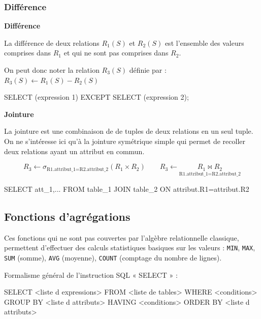 \documentclass[10pt,fleqn]{article} %
\begin{document}
\subsubsection{Différence}
\begin{defi}

\textbf{Différence}

La différence de deux relations $R_1(S)$ et $R_2(S)$ est l'ensemble des valeurs comprises dans $R_1$ et qui ne sont pas comprises dans $R_2$. 

On peut donc noter la relation $R_3(S)$ définie par : $R_3(S)\leftarrow R_1(S)-R_2(S)$


\end{defi}

\begin{envsql}
\begin{sql}
SELECT  (expression 1) EXCEPT SELECT (expression 2);
\end{sql}
\end{envsql}



\begin{defi}

\textbf{Jointure}

La jointure est une combinaison de de tuples de deux relations en un seul tuple. On ne s'intéresse ici qu'à la jointure symétrique simple qui permet de recoller deux relations ayant un attribut en commun. 

$$ 
R_3 \leftarrow \sigma_{\text{R1.attribut\_1=R2.attribut\_2}} (R_1\times R_2) \quad \quad 
R_3 \leftarrow \underset{\text{R1.attribut\_1=R2.attribut\_2}}{R_1 \bowtie R_2}
$$

\end{defi}

\begin{envsql}
\begin{sql}
SELECT att_1,... FROM table_1 JOIN table_2 ON attribut.R1=attribut.R2
\end{sql}
\end{envsql}


\subsection{Fonctions d'agrégations}
\begin{defi}
Ces fonctions qui ne sont pas couvertes par l’algèbre relationnelle 
classique, permettent d’effectuer des calculs statistiques basiques sur les valeurs : \texttt{MIN}, \texttt{MAX}, \texttt{SUM} 
(somme), \texttt{AVG} (moyenne), \texttt{COUNT} (comptage du nombre de lignes). 

\end{defi}


\begin{rem}
Formalisme général de l’instruction SQL « SELECT » :
\begin{envsql}
\begin{sql}
SELECT <liste d expressions> 
    FROM <liste de tables> 
    WHERE <conditions> 
    GROUP BY <liste d attributs> 
    HAVING <conditions> 
    ORDER BY <liste d attributs> 
\end{sql}
\end{envsql}
\end{rem}
\end{document}

